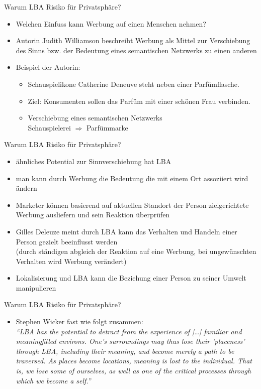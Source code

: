 \begin{frame}{Warum LBA Risiko für Privatsphäre?}
 \begin{itemize}
   \item Welchen Einfuss kann Werbung auf einen Menschen nehmen?
   \item Autorin Judith Williamson beschreibt Werbung als Mittel zur Verschiebung des Sinns bzw. der Bedeutung eines semantischen Netzwerks zu einen anderen
   \item Beispiel der Autorin:
   \begin{itemize}
     \item Schauspielikone Catherine Deneuve steht neben einer Parfümflasche.
     \item Ziel: Konsumenten sollen das Parfüm mit einer schönen Frau verbinden.
     \item Verschiebung eines semantischen Netzwerks\\
     Schauspielerei $\Rightarrow$ Parfümmarke
   \end{itemize}
 \end{itemize}
\end{frame}

\begin{frame}{Warum LBA Risiko für Privatsphäre?}
 \begin{itemize}
   \item ähnliches Potential zur Sinnverschiebung hat LBA
   \item man kann durch Werbung die Bedeutung die mit einem Ort assoziiert wird ändern
   \item Marketer können basierend auf aktuellen Standort der Person zielgerichtete Werbung ausliefern und sein Reaktion überprüfen
   \item Gilles Deleuze meint durch LBA kann das Verhalten und Handeln einer Person gezielt beeinflusst werden\\
   (durch ständigen abgleich der Reaktion auf eine Werbung, bei ungewünschten Verhalten wird Werbung verändert)
   \item Lokalisierung und LBA kann die Beziehung einer Person zu seiner Umwelt manipulieren
 \end{itemize}
\end{frame}

\begin{frame}{Warum LBA Risiko für Privatsphäre?}
 \begin{itemize}
   \item Stephen Wicker fast wie folgt zusammen:\\ \vspace{.5cm}
   \textit{"`LBA has the potential to detract from the experience of [\dots] familiar and meaningfilled environs. One’s surroundings may thus lose their ’placeness’ through LBA, including their meaning, and become merely a path to be traversed. As places become locations, meaning is lost to the individual. That is, we lose some of ourselves, as well as one of the critical processes through which we become a self."'}
 \end{itemize}
\end{frame}

